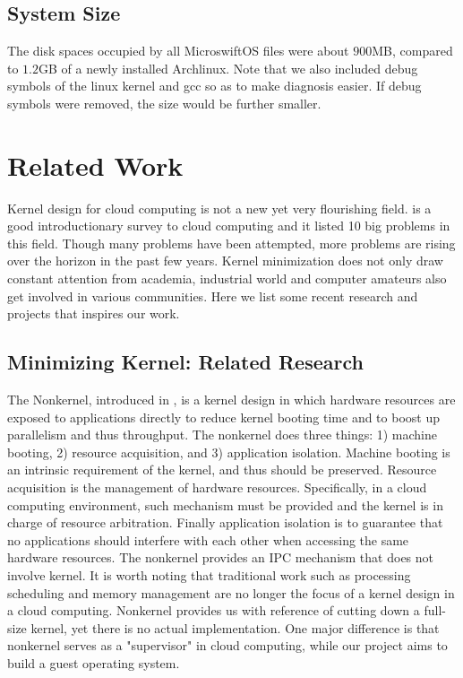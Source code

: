 \subsection{System Size}
The disk spaces occupied by all MicroswiftOS files were about $900$MB, compared to $1.2$GB of a newly installed Archlinux. Note that we also included debug symbols of the linux kernel and gcc so as to make diagnosis easier. If debug symbols were removed, the size would be further smaller.


\section{Related Work}
\label{sec:related}
Kernel design for cloud computing is not a new yet very flourishing field. \cite{fox2009above} is a good introductionary survey to cloud computing and it listed 10 big problems in this field. Though many problems have been attempted, more problems are rising over the horizon in the past few years. Kernel minimization does not only draw constant attention from academia, industrial world and computer amateurs also get involved in various communities. Here we list some recent research and projects that inspires our work. 
\subsection{Minimizing Kernel: Related Research}

The Nonkernel, introduced in \cite{ben2013nonkernel}, is a kernel design in which hardware resources are exposed to applications directly to reduce kernel booting time and to boost up parallelism and thus throughput. The nonkernel does three things: 1) machine booting, 2) resource acquisition, and 3) application isolation. Machine booting is an intrinsic requirement of the kernel, and thus should be preserved. Resource acquisition is the management of hardware resources. Specifically, in a cloud computing environment, such mechanism must be provided and the kernel is in charge of resource arbitration. Finally application isolation is to guarantee that no applications should interfere with each other when accessing the same hardware resources. The nonkernel provides an IPC mechanism that does not involve kernel. It is worth noting that traditional work such as processing scheduling and memory management are no longer the focus of a kernel design in a cloud computing. Nonkernel provides us with reference of cutting down a full-size kernel, yet there is no actual implementation. One major difference is that nonkernel serves as a "supervisor" in cloud computing, while our project aims to build a guest operating system.

